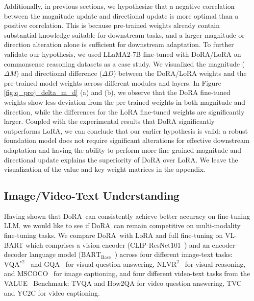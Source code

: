 \documentclass{article}
\newcommand{\ours}{DoRA}
\theoremstyle{plain}
\theoremstyle{definition}
\theoremstyle{remark}
\begin{document}
Additionally, in previous sections, we hypothesize that a negative correlation between the magnitude update and directional update is more optimal than a positive correlation. This is because pre-trained weights already contain substantial knowledge suitable for downstream tasks, and a larger magnitude or direction alteration alone is sufficient for downstream adaptation. To further validate our hypothesis, we used LLaMA2-7B fine-tuned with DoRA/LoRA on commonsense reasoning datasets as a case study. We visualized the magnitude ($\Delta M$) and directional difference ($\Delta D$) between the DoRA/LoRA weights and the pre-trained model weights across different modules and layers. In Figure \ref{fig:q_proj_delta_m_d} (a) and (b), we observe that the DoRA fine-tuned weights show less deviation from the pre-trained weights in both magnitude and direction, while the differences for the LoRA fine-tuned weights are significantly larger. Coupled with the experimental results that DoRA significantly outperforms LoRA, we can conclude that our earlier hypothesis is valid: a robust foundation model does not require significant alterations for effective downstream adaptation and having the ability to perform more fine-grained magnitude and directional update explains the superiority of DoRA over LoRA. We leave the visualization of the value and key weight matrices in the appendix.


\subsection{Image/Video-Text Understanding}


Having shown that \ours~can consistently achieve better accuracy on fine-tuning LLM, we would like to see if \ours~can remain competitive on multi-modality fine-tuning tasks. We compare \ours~with LoRA and full fine-tuning on VL-BART which comprises a vision encoder (CLIP-ResNet101~\cite{radford2021clip}) and an encoder-decoder language model ($\text{BART}_{\text{Base}}$~\cite{lewis2019bart}) across four different image-text tasks: $\text{VQA}^{\text{v2}}$~\cite{goyal2017vaqv2} and GQA~\cite{hudson2019gqa} for visual question answering, $\text{NLVR}^2$~\cite{suhr2019nlvr2} for visual reasoning, and MSCOCO~\cite{chen2015mscoco} for image captioning, and four different video-text tasks from the VALUE~\cite{li2021value} Benchmark: TVQA \cite{lei2019tvqa} and How2QA \cite{li2020hero} for video question answering, TVC \cite{lei2020tvr} and YC2C \cite{zhou2017automatic} for video captioning. 
\end{document}

